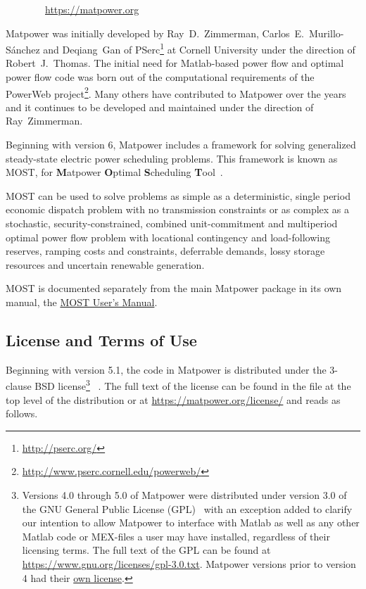 \documentclass[12pt]{article}
\newcommand{\matlab}[0]{{\sc Matlab}}
\newcommand{\matpower}[0]{{\sc Matpower}}
\newcommand{\matpowerurl}[0]{https://matpower.org}
\newcommand{\most}[0]{{MOST}}
\newcommand{\mostname}[0]{{{\bf M}{\sc atpower} \textbf{O}ptimal \textbf{S}cheduling \textbf{T}ool}}
\newcommand{\mostver}[0]{1.1}
\newcommand{\pserc}[0]{{\sc PSerc}}
\newcommand{\code}[1]{{\relsize{-0.5}{\tt{{#1}}}}}  %
\newcommand{\mostmanurl}[0]{https://matpower.org/docs/MOST-manual-\mostver.pdf}
\newcommand{\mostman}[0]{\href{\mostmanurl}{\most{} User's Manual}}
\numberwithin{equation}{section}
\numberwithin{table}{section}
\numberwithin{figure}{section}
\begin{document}
\bigskip

~~~~~~~~\url{\matpowerurl}

\bigskip

\matpower{} was initially developed by Ray~D.~Zimmerman, Carlos~E.~Murillo-S\'anchez and Deqiang~Gan of \pserc{}\footnote{\url{http://pserc.org/}} at Cornell University under the direction of Robert~J.~Thomas. The initial need for \matlab{}-based power flow and optimal power flow code was born out of the computational requirements of the PowerWeb project\footnote{\url{http://www.pserc.cornell.edu/powerweb/}}. Many others have contributed to \matpower{} over the years and it continues to be developed and maintained under the direction of Ray~Zimmerman.

Beginning with version 6, \matpower{} includes a framework for solving generalized steady-state electric power scheduling problems. This framework is known as \most{}, for \mostname{}~\cite{murillo-sanchez2013a,lamadrid2018}.

\most{} can be used to solve problems as simple as a deterministic, single period economic dispatch problem with no transmission constraints or as complex as a stochastic, security-constrained, combined unit-commitment and multiperiod optimal power flow problem with locational contingency and load-following reserves, ramping costs and constraints, deferrable demands, lossy storage resources and uncertain renewable generation.

\most{} is documented separately from the main \matpower{} package in its own manual, the \mostman{}.

\pagebreak
\subsection{License and Terms of Use}

Beginning with version 5.1, the code in \matpower{} is distributed under the 3-clause BSD license\footnote{Versions 4.0 through 5.0 of \matpower{} were distributed under version 3.0 of the GNU General Public License (GPL)~\cite{gpl} with an exception added to clarify our intention to allow \matpower{} to interface with \matlab{} as well as any other \matlab{} code or MEX-files a user may have installed, regardless of their licensing terms. The full text of the GPL can be found at \url{https://www.gnu.org/licenses/gpl-3.0.txt}. \matpower{} versions prior to version 4 had their \href{https://matpower.org/license/old}{own license}.}
~\cite{bsd}. The full text of the license can be found in the \code{LICENSE} file at the top level of the distribution or at \url{https://matpower.org/license/} and reads as follows.
\end{document}
